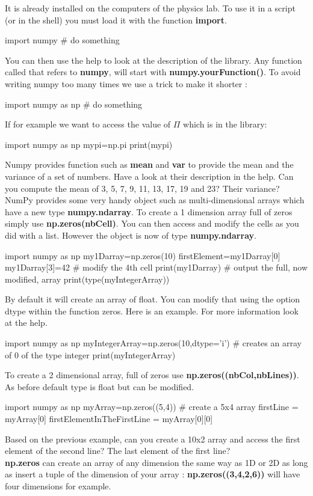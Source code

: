 \documentclass[article,10pt]{scrartcl}
\begin{document}
It is already installed on the computers of the physics lab. To use it in a script (or in the shell) you must load it with the function \textbf{import}.
\begin{python}
import numpy
# do something
\end{python}

 You can then use the help to look at the description of the library. Any  function called that refers to \textbf{numpy}, will start with \textbf{numpy.yourFunction()}. To avoid writing numpy too many times we use a trick to make it shorter :
\begin{python}
import numpy as np
# do something
\end{python}
If for example we want to access the value of $\Pi$ which is in the library:
\begin{python}
import numpy as np
mypi=np.pi
print(mypi)
\end{python}
Numpy provides function such as \textbf{mean} and \textbf{var} to provide the mean and the variance of a set of numbers. Have a look at their description in the help. Can you compute the mean of 3, 5, 7, 9, 11, 13, 17, 19 and 23? Their variance?
\\


NumPy provides some very handy object such as multi-dimensional arrays which have a new type \textbf{numpy.ndarray}. To create a 1 dimension array full of zeros simply use \textbf{np.zeros(nbCell)}. You can then access and modify the cells as you did with a list. However the object is now of type \textbf{numpy.ndarray}.\\
\begin{python}
import numpy as np
my1Darray=np.zeros(10)
firstElement=my1Darray[0]
my1Darray[3]=42 # modify the 4th cell
print(my1Darray) # output the full, now modified, array
print(type(myIntegerArray)) 
\end{python}

By default it will create an array of float. You can modify that using the option dtype within the function zeros. Here is an example. For more information look at the help.
\begin{python}
import numpy as np
myIntegerArray=np.zeros(10,dtype='i') # creates an array of 0 of the type integer
print(myIntegerArray) 
\end{python}


 To create a 2 dimensional array, full of zeros use \textbf{np.zeros((nbCol,nbLines))}. As before default type is float but can be modified.
\begin{python}
import numpy as np
myArray=np.zeros((5,4)) # create a 5x4 array
firstLine = myArray[0]
firstElementInTheFirstLine = myArray[0][0]
\end{python}
Based on the previous example, can you create a 10x2 array and access the first element of the second line? The last element of the first line?
\\
\textbf{np.zeros} can create an array of any dimension the same way as 1D or 2D as long as insert a tuple of the dimension of your array : \textbf{np.zeros((3,4,2,6))} will have four dimensions for example.
\\
\end{document}
